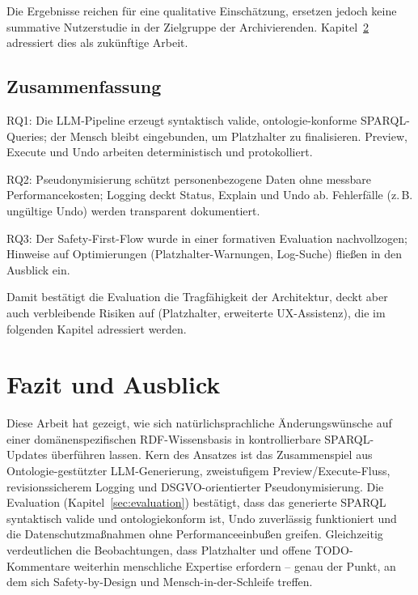 Die Ergebnisse reichen für eine qualitative Einschätzung, ersetzen jedoch keine summative Nutzerstudie in der Zielgruppe der Archivierenden. Kapitel~\ref{sec:fazit} adressiert dies als zukünftige Arbeit.

\section{Zusammenfassung}

RQ1: Die LLM-Pipeline erzeugt syntaktisch valide, ontologie-konforme SPARQL-Queries; der Mensch bleibt eingebunden, um Platzhalter zu finalisieren. Preview, Execute und Undo arbeiten deterministisch und protokolliert.

RQ2: Pseudonymisierung schützt personenbezogene Daten ohne messbare Performancekosten; Logging deckt Status, Explain und Undo ab. Fehlerfälle (z.\,B. ungültige Undo) werden transparent dokumentiert.

RQ3: Der Safety-First-Flow wurde in einer formativen Evaluation nachvollzogen; Hinweise auf Optimierungen (Platzhalter-Warnungen, Log-Suche) fließen in den Ausblick ein.

Damit bestätigt die Evaluation die Tragfähigkeit der Architektur, deckt aber auch verbleibende Risiken auf (Platzhalter, erweiterte UX-Assistenz), die im folgenden Kapitel adressiert werden.




\chapter{Fazit und Ausblick}
\label{sec:fazit}

Diese Arbeit hat gezeigt, wie sich natürlichsprachliche Änderungswünsche auf einer domänenspezifischen RDF-Wissensbasis in kontrollierbare SPARQL-Updates überführen lassen. Kern des Ansatzes ist das Zusammenspiel aus Ontologie-gestützter LLM-Generierung, zweistufigem Preview/Execute-Fluss, revisionssicherem Logging und DSGVO-orientierter Pseudonymisierung. Die Evaluation (Kapitel~\ref{sec:evaluation}) bestätigt, dass das generierte SPARQL syntaktisch valide und ontologiekonform ist, Undo zuverlässig funktioniert und die Datenschutzmaßnahmen ohne Performanceeinbußen greifen. Gleichzeitig verdeutlichen die Beobachtungen, dass Platzhalter und offene TODO-Kommentare weiterhin menschliche Expertise erfordern – genau der Punkt, an dem sich Safety-by-Design und Mensch-in-der-Schleife treffen.

